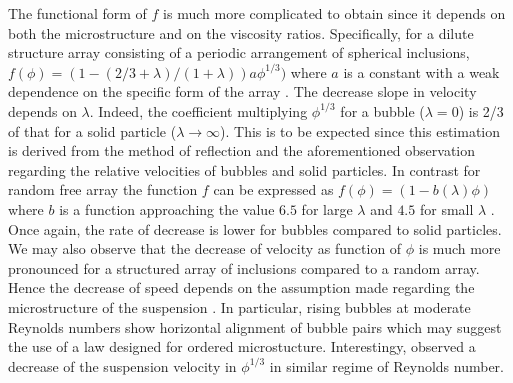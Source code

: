 The functional form of $f$ is much more complicated to obtain since it depends on both the microstructure and on the viscosity ratios. Specifically, for a dilute structure array consisting of a periodic arrangement of spherical inclusions, $f(\phi) =(1 - (2/3+\lambda)/(1+\lambda))a\phi^{1/3})$ where $a$ is a constant with a weak dependence on the specific form of the array \citep{sangani1987}. The decrease slope in velocity depends on $\lambda$. Indeed, the coefficient multiplying $\phi^{1/3}$ for a bubble ($\lambda=0$) is 2/3 of that for a solid particle ($\lambda \to \infty$). This is to be expected since this estimation is derived from the method of reflection and the aforementioned observation regarding the relative velocities of bubbles and solid particles. In contrast for random free array the function $f$ can be expressed as  $f(\phi) = (1-b(\lambda)\phi)$ where $b$ is a function approaching the value $6.5$ for large $\lambda$ and $4.5$ for small $\lambda$ \citep{wacholder1973,haber1981}. Once again, the rate of decrease is lower for bubbles compared to solid particles. We may also observe that the decrease of velocity as function of $\phi$ is much more pronounced for a structured array of inclusions compared to a random array. Hence the decrease of speed depends on the assumption made regarding the microstructure of the suspension \citep{davis1985}. In particular, rising bubbles at moderate Reynolds numbers show horizontal alignment of bubble pairs \citep{bunner2002dynamics,yin2006} which may suggest the use of a law designed for ordered microstucture. 
Interestingy, \citet{loisy2017} observed a decrease of the suspension velocity in $\phi^{1/3}$ in similar regime of Reynolds number. 


